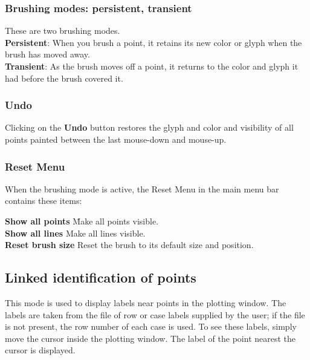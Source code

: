 \documentclass[11pt]{article}
\begin{document}
%
\subsubsection{Brushing modes:  persistent, transient}
%
These are two brushing modes.
\medskip
\noindent
\\{\bf Persistent}:  When you brush a point, it retains its new color or glyph
when the brush has moved away.
\\{\bf Transient}:  As the brush moves off a point, it returns to the color and
glyph it had before the brush covered it.

\subsubsection{Undo}
%
Clicking on the {\bf Undo} button restores the glyph and color and
visibility of all points painted between the last mouse-down and
mouse-up.

\subsubsection{Reset Menu}
%
When the brushing mode is active, the Reset Menu in the main
menu bar contains these items:

\begin{tabbing}
 {\bf Show all points} \hspace{.5in} \= Make all points visible. \\
 {\bf Show all lines} \> Make all lines visible. \\
 {\bf Reset brush size} \> Reset the brush to its default size and position. \\
\end{tabbing}
%

\subsection{Linked identification of points}

This mode is used to display labels near points in the plotting
window.  The labels are taken from the file of row or case labels
supplied by the user; if the file is not present, the row number of
each case is used.  To see these labels, simply move the cursor
inside the plotting window.  The label of the point nearest the
cursor is displayed.
\end{document}
